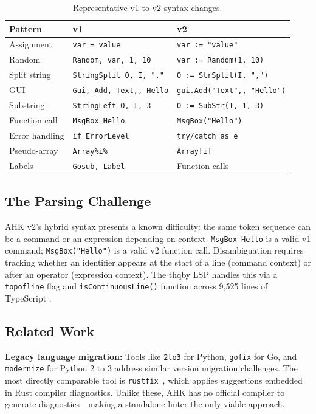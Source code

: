 \documentclass[11pt,a4paper]{article}
\begin{document}
\begin{table}[h]
\centering\small
\caption{Representative v1-to-v2 syntax changes.}
\label{tab:syntax}
\begin{tabular}{lll}
\toprule
\textbf{Pattern} & \textbf{v1} & \textbf{v2} \\
\midrule
Assignment & \texttt{var = value} & \texttt{var := "value"} \\
Random & \texttt{Random, var, 1, 10} & \texttt{var := Random(1, 10)} \\
Split string & \texttt{StringSplit O, I, ","} & \texttt{O := StrSplit(I, ",")} \\
GUI & \texttt{Gui, Add, Text,, Hello} & \texttt{gui.Add("Text",, "Hello")} \\
Substring & \texttt{StringLeft O, I, 3} & \texttt{O := SubStr(I, 1, 3)} \\
Function call & \texttt{MsgBox Hello} & \texttt{MsgBox("Hello")} \\
Error handling & \texttt{if ErrorLevel} & \texttt{try/catch as e} \\
Pseudo-array & \texttt{Array\%i\%} & \texttt{Array[i]} \\
Labels & \texttt{Gosub, Label} & Function calls \\
\bottomrule
\end{tabular}
\end{table}

\subsection{The Parsing Challenge}

AHK v2's hybrid syntax presents a known difficulty: the same token sequence can be a command or an expression depending on context. \texttt{MsgBox Hello} is a valid v1 command; \texttt{MsgBox("Hello")} is a valid v2 function call. Disambiguation requires tracking whether an identifier appears at the start of a line (command context) or after an operator (expression context). The thqby LSP handles this via a \texttt{topofline} flag and \texttt{isContinuousLine()} function across 9,525 lines of TypeScript \cite{thqby}.

\subsection{Related Work}

\textbf{Legacy language migration:} Tools like \texttt{2to3} for Python, \texttt{gofix} for Go, and \texttt{modernize} for Python 2 to 3 address similar version migration challenges. The most directly comparable tool is \texttt{rustfix}~\cite{rustfix}, which applies suggestions embedded in Rust compiler diagnostics. Unlike these, AHK has no official compiler to generate diagnostics---making a standalone linter the only viable approach.
\end{document}
